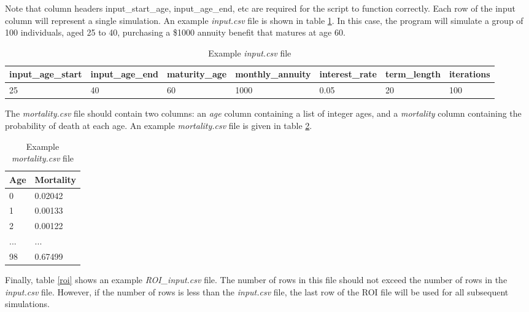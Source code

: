 \documentclass[12pt]{article}
\begin{document}
Note that column headers input\_start\_age, input\_age\_end, etc are required for the script to function correctly. Each row of the input column will represent a single simulation. An example \textit{input.csv} file is shown in table \ref{example}. In this case, the program will simulate a group of 100 individuals, aged 25 to 40, purchasing a \$1000 annuity benefit that matures at age 60. 



\begin{table}[H]
	\begin{adjustwidth}{-.5in}{-.5in}  
		\footnotesize{
		\begin{tabular}{|l|l|l|l|l|l|l|}
			\hline
			\textbf{input\_age\_start} & \textbf{input\_age\_end} & \textbf{maturity\_age} & \textbf{monthly\_annuity} & \textbf{interest\_rate} & \textbf{term\_length} & \textbf{iterations} \\ \hline
			25 & 40 & 60 & 1000 & 0.05 & 20 & 100 \\ \hline
		\end{tabular}
		\label{example}
		\caption{Example \textit{input.csv} file}
	}
	\end{adjustwidth}
\end{table}

The \textit{mortality.csv} file should contain two columns: an \textit{age} column containing a list of integer ages, and a \textit{mortality} column containing the probability of death at each age. An example \textit{mortality.csv} file is given in table \ref{mortality}. 

\begin{table}[H]
	\centering
	\begin{tabular}{|l|l|}
		\hline
		Age & Mortality \\ \hline
		0 & 0.02042 \\ \hline
		1 & 0.00133 \\ \hline
		2 & 0.00122 \\ \hline
		... & ... \\ \hline
		98 & 0.67499 \\ \hline
	\end{tabular}
	\caption{Example \textit{mortality.csv} file}
	\label{mortality}
\end{table}

Finally, table \ref{roi} shows an example \textit{ROI\_input.csv} file. The number of rows in this file should not exceed the number of rows in the  \textit{input.csv} file. However, if the number of rows is less than the  \textit{input.csv} file, the last row of the ROI file will be used for all subsequent simulations. 
\end{document}

